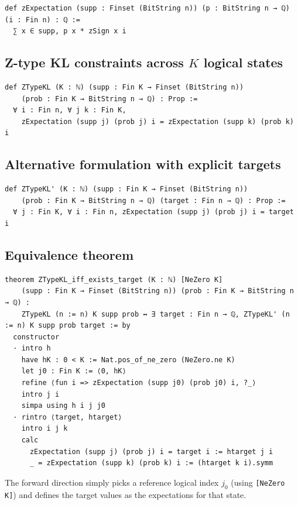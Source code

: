 \documentclass[11pt]{article}
\begin{document}
\begin{lstlisting}
def zExpectation (supp : Finset (BitString n)) (p : BitString n → ℚ) (i : Fin n) : ℚ :=
  ∑ x ∈ supp, p x * zSign x i
\end{lstlisting}

\subsection*{Z-type KL constraints across $K$ logical states}

\begin{lstlisting}
def ZTypeKL (K : ℕ) (supp : Fin K → Finset (BitString n))
    (prob : Fin K → BitString n → ℚ) : Prop :=
  ∀ i : Fin n, ∀ j k : Fin K,
    zExpectation (supp j) (prob j) i = zExpectation (supp k) (prob k) i
\end{lstlisting}

\subsection*{Alternative formulation with explicit targets}

\begin{lstlisting}
def ZTypeKL' (K : ℕ) (supp : Fin K → Finset (BitString n))
    (prob : Fin K → BitString n → ℚ) (target : Fin n → ℚ) : Prop :=
  ∀ j : Fin K, ∀ i : Fin n, zExpectation (supp j) (prob j) i = target i
\end{lstlisting}

\subsection*{Equivalence theorem}

\begin{lstlisting}
theorem ZTypeKL_iff_exists_target (K : ℕ) [NeZero K]
    (supp : Fin K → Finset (BitString n)) (prob : Fin K → BitString n → ℚ) :
    ZTypeKL (n := n) K supp prob ↔ ∃ target : Fin n → ℚ, ZTypeKL' (n := n) K supp prob target := by
  constructor
  · intro h
    have hK : 0 < K := Nat.pos_of_ne_zero (NeZero.ne K)
    let j0 : Fin K := ⟨0, hK⟩
    refine ⟨fun i => zExpectation (supp j0) (prob j0) i, ?_⟩
    intro j i
    simpa using h i j j0
  · rintro ⟨target, htarget⟩
    intro i j k
    calc
      zExpectation (supp j) (prob j) i = target i := htarget j i
      _ = zExpectation (supp k) (prob k) i := (htarget k i).symm
\end{lstlisting}

The forward direction simply picks a reference logical index $j_0$ (using \texttt{[NeZero K]}) and defines the target values as the expectations for that state.
\end{document}
